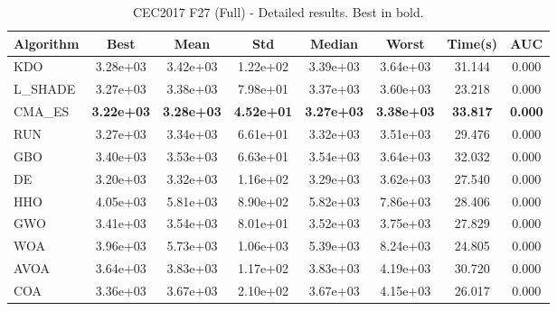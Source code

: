 \begin{table}[H]
\centering\small
\caption{CEC2017 F27 (Full) - Detailed results. Best in bold.}
\label{tab:cec2017_F27}
\begin{tabular}{lccccccc}
\toprule
\textbf{Algorithm} & \textbf{Best} & \textbf{Mean} & \textbf{Std} & \textbf{Median} & \textbf{Worst} & \textbf{Time(s)} & \textbf{AUC} \\
\midrule
KDO & 3.28e+03 & 3.42e+03 & 1.22e+02 & 3.39e+03 & 3.64e+03 & 31.144 & 0.000 \\
L_SHADE & 3.27e+03 & 3.38e+03 & 7.98e+01 & 3.37e+03 & 3.60e+03 & 23.218 & 0.000 \\
CMA_ES & \textbf{3.22e+03} & \textbf{3.28e+03} & \textbf{4.52e+01} & \textbf{3.27e+03} & \textbf{3.38e+03} & \textbf{33.817} & \textbf{0.000} \\
RUN & 3.27e+03 & 3.34e+03 & 6.61e+01 & 3.32e+03 & 3.51e+03 & 29.476 & 0.000 \\
GBO & 3.40e+03 & 3.53e+03 & 6.63e+01 & 3.54e+03 & 3.64e+03 & 32.032 & 0.000 \\
DE & 3.20e+03 & 3.32e+03 & 1.16e+02 & 3.29e+03 & 3.62e+03 & 27.540 & 0.000 \\
HHO & 4.05e+03 & 5.81e+03 & 8.90e+02 & 5.82e+03 & 7.86e+03 & 28.406 & 0.000 \\
GWO & 3.41e+03 & 3.54e+03 & 8.01e+01 & 3.52e+03 & 3.75e+03 & 27.829 & 0.000 \\
WOA & 3.96e+03 & 5.73e+03 & 1.06e+03 & 5.39e+03 & 8.24e+03 & 24.805 & 0.000 \\
AVOA & 3.64e+03 & 3.83e+03 & 1.17e+02 & 3.83e+03 & 4.19e+03 & 30.720 & 0.000 \\
COA & 3.36e+03 & 3.67e+03 & 2.10e+02 & 3.67e+03 & 4.15e+03 & 26.017 & 0.000 \\
\bottomrule
\end{tabular}
\end{table}
